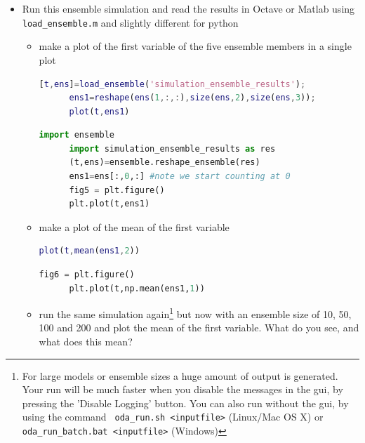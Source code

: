 \begin{itemize}
      
\item Run this ensemble simulation and read the results in Octave or
      Matlab using \texttt{ load\_ensemble.m} and slightly different for python
      \begin{itemize}
      \item make a plot of the first variable of the five ensemble
            members in a single plot
      \begin{lstlisting}[language=Matlab,frame=single,caption={Matlab}]
      [t,ens]=load_ensemble('simulation_ensemble_results');
      ens1=reshape(ens(1,:,:),size(ens,2),size(ens,3));
      plot(t,ens1)
      \end{lstlisting}
      \begin{lstlisting}[language=Python,frame=single,caption={Python}]
      import ensemble
      import simulation_ensemble_results as res
      (t,ens)=ensemble.reshape_ensemble(res)
      ens1=ens[:,0,:] #note we start counting at 0
      fig5 = plt.figure()
      plt.plot(t,ens1)
      \end{lstlisting}
      \item make a plot of the mean of the first variable
      \begin{lstlisting}[language=Matlab,frame=single,caption={Matlab}]
      plot(t,mean(ens1,2))
      \end{lstlisting}
      \begin{lstlisting}[language=Python,frame=single,caption={Python}]
      fig6 = plt.figure()
      plt.plot(t,np.mean(ens1,1))
      \end{lstlisting}
      \item run the same simulation again\footnote{For large models or
            ensemble sizes a huge amount of output is generated. Your
            run will be much faster when you disable the messages in
            the gui, by pressing the 'Disable Logging' button.
            You can also run without the gui, by using the command
            \texttt{ oda\_run.sh <inputfile>} (Linux/Mac OS X) or
            \texttt{ oda\_run\_batch.bat <inputfile>} (Windows)}
            but now with an ensemble size of 10, 50, 100 and 200 and
            plot the mean of the first variable. What do you see, and
            what does this mean?
      \end{itemize}
\end{itemize}
